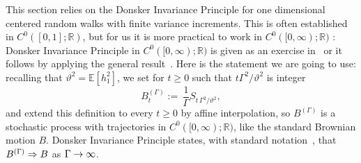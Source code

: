 \documentclass[10pt]{amsart}
\theoremstyle{definition}\newtheorem{defi}[theo]{Definition}\newtheorem{rema}[theo]{Remark}\newtheorem{exam}[theo]{Example}\newtheorem{exem}[theo]{Example}\newtheorem{nota}[theo]{Notation}
\newcommand{\bbE}{\mathbb{E}}
\newcommand{\bbR}{\mathbb{R}}
\newcommand{\gG}{\Gamma}
\renewcommand*{\implies}{\mathchoice{\Longrightarrow}{\Rightarrow}{\Rightarrow}{\Rightarrow}}
\renewcommand*{\to}{\mathchoice{\longrightarrow}{\rightarrow}{\rightarrow}{\rightarrow}}
\begin{document}
This section relies on the Donsker Invariance Principle for one dimensional centered random walks with finite variance increments. This is often established in $C^0([0, 1]; \bbR)$, but for us it is more practical to work in $C^0([0, \infty); \bbR)$ \cite[Section~1.3]{cf:StroockVaradhan}: Donsker Invariance Principle in $C^0([0, \infty); \bbR)$ is given as an exercise in~\cite[Example~2.4.2]{cf:StroockVaradhan} or it follows by applying the general result~\cite[Theorem~11.2.3]{cf:StroockVaradhan}. Here is the statement we are going to use: recalling that $\vartheta^2=\bbE\left[h_1^2\right]$, we set for $t\ge 0$ such that $ t\gG^2/\vartheta^2$ is integer
\begin{equation}\label{eq:BgGt}
B^{(\gG)}_t:= \, \frac 1 \gG S_{t \,\gG^2 / \vartheta^2},
\end{equation}
and extend this definition to every $t\ge 0$ by affine interpolation, so $B^{(\gG)}$ is a stochastic process with trajectories in $C^0([0, \infty); \bbR)$, like the standard Brownian motion $B$. Donsker Invariance Principle states, with standard notation~\cite{cf:Bill}, that $B^{(\gG)} \implies B$ as $\gG \to \infty$.
\end{document}
